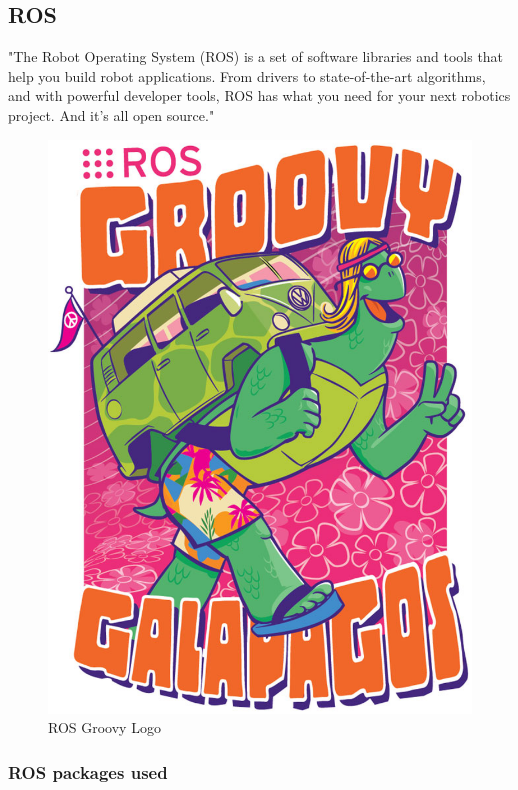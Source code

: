 \subsection{ROS}

"The Robot Operating System (ROS) is a set of software libraries and tools that help you build robot applications. From drivers to state-of-the-art algorithms, and with powerful developer tools, ROS has what you need for your next robotics project. And it's all open source."\cite{ros}

\begin{figure}[h]
	\begin{center}
    \includegraphics[scale=0.3]{img/ros/groovy.eps}
	\caption[ROS Groovy Logo]{ROS Groovy Logo}
	\end{center}
\end{figure}


\subsubsection{ROS packages used}